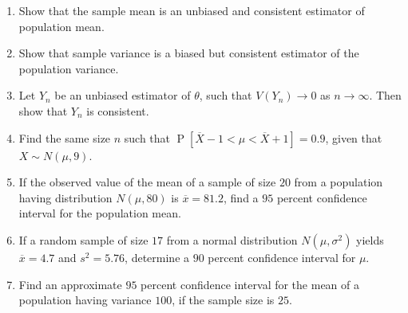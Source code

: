 \documentclass[svgnames]{amsart}
\DeclareMathOperator{\Prob}{P}
\begin{document}
\begin{enumerate}[leftmargin=*, itemsep=2mm]
\item Show that the sample mean is an unbiased and consistent estimator of population mean.

\item Show that sample variance is a biased but consistent estimator of the population variance.

\item Let $Y_n$ be an unbiased estimator of $\theta$, such that $V(Y_n) \to 0$ as $n \to \infty$. Then show that $Y_n$ is consistent.

\item Find the same size $n$ such that $\Prob[\overline X - 1 < \mu < \overline X + 1] = 0.9$, given that $X \sim N(\mu, 9)$.

\item If the observed value of the mean of a sample of size $20$ from a population having distribution $N(\mu, 80)$ is $\overline x = 81.2$, find a $95$ percent confidence interval for the population mean.

\item If a random sample of size $17$ from a normal distribution $N(\mu, \sigma^2)$ yields $\overline x = 4.7$ and $s^2 = 5.76$, determine a $90$ percent confidence interval for $\mu$.

\item Find an approximate $95$ percent confidence interval for the mean of a population having variance $100$, if the sample size is $25$.

\end{enumerate}
\end{document}
